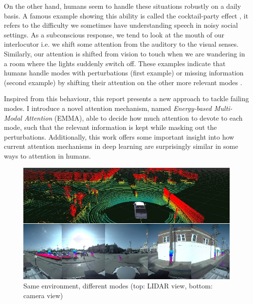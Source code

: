 On the other hand, humans seem to handle these situations robustly on a daily basis. A famous example showing this ability is called the cocktail-party effect \citep{cocktail-party}, it refers to the difficulty we sometimes have understanding speech in noisy social settings. As a subconscious response, we tend to look at the mouth of our interlocutor i.e. we shift some attention from the auditory to the visual senses. Similarly, our attention is shifted from vision to touch when we are wandering in a room where the lights suddenly switch off. These examples indicate that humans handle modes with perturbations (first example) or missing information (second example) by shifting their attention on the other more relevant modes \citep{crossmodal}.

Inspired from this behaviour, this report presents a new approach to tackle failing modes. I introduce a novel attention mechanism, named \textit{Energy-based Multi-Modal Attention} (EMMA), able to decide how much attention to devote to each mode, such that the relevant information is kept while masking out the perturbations. Additionally, this work offers some important insight into how current attention mechanisms in deep learning are surprisingly similar in some ways to attention in humans.

\begin{figure}[!ht]
\centering
\includegraphics[scale=0.55]{figures/lidar-camera}
\caption[Lidar \& Camera view in self-driving cars]{Same environment, different modes (top: LIDAR view, bottom: camera view)}	
\label{fig:lidar-camera}
\end{figure}



